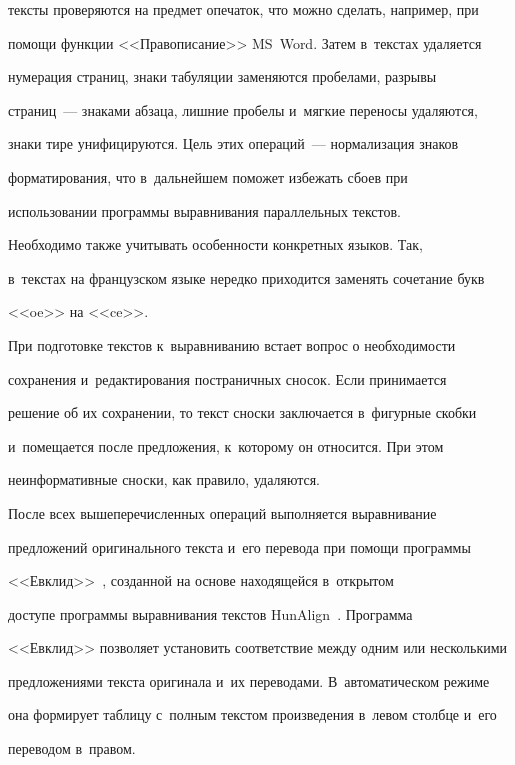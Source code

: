тексты проверяются на предмет опечаток, что можно сделать, например, при 


помощи функции <<Правописание>> MS~Word. Затем в~текстах удаляется 


нумерация страниц, знаки табуляции заменяются пробелами, разрывы 


страниц~--- знаками абзаца, лишние пробелы и~мягкие переносы удаляются, 


знаки тире унифицируются. Цель этих операций~--- нормализация знаков 


форматирования, что в~дальнейшем поможет избежать сбоев при 


использовании программы выравнивания параллельных текстов. 


Необходимо также учитывать особенности конкретных языков. Так,


в~текстах на французском языке нередко приходится заменять сочетание букв 


<<oe>> на <<c\!e>>.


  


  При подготовке текстов к~выравниванию встает вопрос о необходимости 


сохранения и~редактирования постраничных сносок. Если принимается 


решение об их сохранении, то текст сноски заключается в~фигурные скобки 


и~помещается после предложения, к~которому он относится. При этом 


неинформативные сноски, как правило, удаляются.


  


  После всех вышеперечисленных операций выполняется выравнивание 


предложений оригинального текста и~его перевода при помощи программы 


<<Евклид>>~\cite{11-gz}, созданной на основе находящейся в~открытом 


доступе программы выравнивания текстов HunAlign~\cite{12-gz}. Программа 


<<Евклид>> позволяет установить соответствие между одним или несколькими 


предложениями текста оригинала и~их переводами. В~автоматическом режиме 


она формирует таблицу с~полным текстом произведения в~левом столбце и~его 


переводом в~правом.


